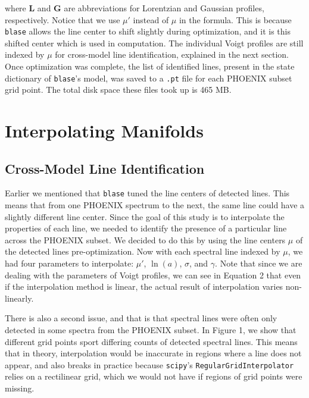 \documentclass[twocolumn]{aastex631}
\begin{document}
where $\mathbf{L}$ and $\mathbf{G}$ are abbreviations for Lorentzian and 
Gaussian profiles, respectively. Notice that we use $\mu'$ instead of $\mu$ 
in the formula. This is because \texttt{blase} allows the line center to shift 
slightly during optimization, and it is this shifted center which is used in 
computation. The individual Voigt profiles are still indexed by $\mu$ for 
cross-model line identification, explained in the next section. Once optimization 
was complete, the list of identified lines, present in the state dictionary of 
\texttt{blase}'s model, was saved to a \texttt{.pt} file for each PHOENIX subset 
grid point. The total disk space these files took up is 465 MB.

\section{Interpolating Manifolds}
\subsection{Cross-Model Line Identification}
Earlier we mentioned that \texttt{blase} tuned the line centers of
detected lines. This means that from one PHOENIX spectrum to the next, the
same line could have a slightly different line center. Since the goal of this
study is to interpolate the properties of each line, we needed to identify the
presence of a particular line across the PHOENIX subset. We decided to do
this by using the line centers $\mu$ of the detected lines pre-optimization. 
Now with each spectral line indexed by $\mu$, we had four parameters to interpolate:
$\mu'$, $\ln(a)$, $\sigma$, and $\gamma$. Note that since we are dealing with 
the parameters of Voigt profiles, we can see in Equation 2 that even if the 
interpolation method is linear, the actual result of interpolation varies 
non-linearly.

There is also a second issue, and that is that spectral lines were often
only detected in some spectra from the PHOENIX subset. In Figure 1, we show
that different grid points sport differing counts of detected spectral lines.
This means that in theory, interpolation would be inaccurate in regions where 
a line does not appear, and also breaks in practice because \texttt{scipy}'s 
\texttt{RegularGridInterpolator} relies on a rectilinear grid, which we would not 
have if regions of grid points were missing. 
\end{document}
